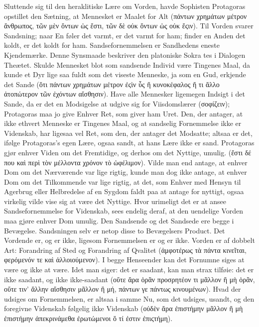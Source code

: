 \documentclass[12pt]{book}
\newcommand{\opage}[1]{\marginnote{\footnotesize\textit{[#1]}}}
\begin{document}
Sluttende sig til den heraklitiske Lære om Vorden, havde Sophisten Protagoras opstillet den
Sætning, at Mennesket er Maalet for Alt (πάντων χρημάτων μέτρον ἄνθρωπος, τῶν μὲν ὄντων ὡς ἔστι,
τῶν δὲ οὐκ ὄντων ὡς οὐκ ἔϛιν). Til Vorden svarer Sandsning; naar En føler det varmt, er det
varmt for ham; finder en Anden det koldt, er det koldt for ham. Sandsefornemmelsen er Sandhedens
eneste Kjendemærke. Denne Synsmaade beskriver den platoniske Sokra%
\opage{127}tes i Dialogen Theætet. Skulde Mennesket blot som sandsende Individ være Tingenes Maal, da kunde
et Dyr lige%
saa fuldt som det viseste Menneske, ja som en Gud, erkjende det Sande (ὅτι πάντων χρημάτων μέτρον
ἐϛὶν ὗς ἢ κυνοκέφαλος ἤ τι ἄλλο ἀτοπώτερον τῶν ἐχόντων αἴσθησιν). Have alle Mennesker ligemegen
Indsigt i det Sande, da er det en Modsigelse at udgive sig for Viisdomslærer (σοφίζειν);
Protagoras maa jo give Enhver Ret, som giver ham Uret. Den, der antager, at ikke ethvert
Menneske er Tingenes Maal, og at sandselig Fornemmelse ikke er Videnskab, har ligesaa vel Ret,
som den, der antager det Modsatte; altsaa er det, ifølge Protagoras's egen Lære, ogsaa sandt, at
hans Lære ikke er sand. Protagoras gjør enhver Viden om det Fremtidige, og derhos om det
Nyttige, umulig. (ἔστι δέ που καὶ περὶ τὸν μέλλοντα χρόνον τὸ ὠφέλιμον). Vilde man end antage, at
enhver Dom om det Nærværende var lige rigtig, kunde man dog ikke antage, at enhver Dom om det
Tilkommende var lige rigtig, at det, som Enhver med Hensyn til Agerbrug eller Helbredelse af en
Sygdom faldt paa at antage for nyttigt, ogsaa virkelig vilde vise sig at være det Nyttige. Hvor
urimeligt det er at ansee Sandsefornemmelse for Videnskab, sees endelig deraf, at den uendelige
Vorden maa gjøre enhver Dom umulig. Den Sandsende og det Sandsede ere begge i Bevægelse.
Sandsningen selv er netop disse to Bevægelsers Product. Det Vordende er, og er ikke, ligesom
Fornemmelsen er og er ikke. Vorden er af dobbelt Art: Forandring af Sted og Forandring af
Qvalitet (ἀμφοτέρως τὰ πάντα κινεῖται, φερόμενόν τε καὶ ἀλλοιούμενον). I begge Henseender kan det
Fornumne siges at være og ikke at være. Idet man siger: det er saadant, kan man strax tilføie:
det er ikke saadant, og ikke ikke-saadant (οὔτε ἄρα ὁρᾶν προσρητέον τι μᾶλλον ἢ μὴ ὁρᾶν, οὔτε
τιν' ἄλλην αἴσθησιν μᾶλλον ἢ μή, πάντων γε πάντως κινουμένων). Hvad der udsiges om Fornemmelsen,
er altsaa i samme Nu, som det udsiges, usandt, og den foregivne Videnskab følgelig ikke
Videnskab (οὐδὲν ἄρα ἐπιστήμην μᾶλλον ἢ μὴ ἐπιστήμην ἀπεκρινάμεθα ἐρωτώμενοι ὅ τί ἐστιν
ἐπιϛτήμη).
\end{document}
